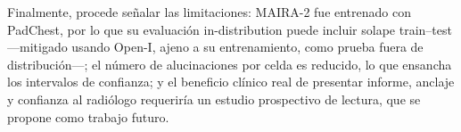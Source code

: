Finalmente, procede señalar las limitaciones:
MAIRA-2 fue entrenado con PadChest, por lo que su evaluación in-distribution puede incluir solape
train--test —mitigado usando Open-I, ajeno a su entrenamiento, como prueba fuera de distribución—; el
número de alucinaciones por celda es reducido, lo que ensancha los intervalos de confianza; y el
beneficio clínico real de presentar informe, anclaje y confianza al radiólogo requeriría un estudio
prospectivo de lectura, que se propone como trabajo futuro.

